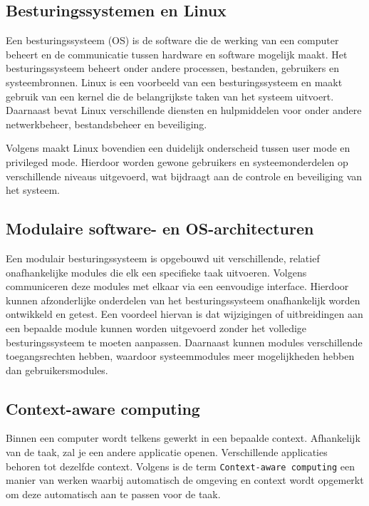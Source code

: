 \documentclass{hogent-article}
\begin{document}
\subsection{Besturingssystemen en Linux}
\label{ssec:besturingssytemen}

Een besturingssysteem (OS) is de software die de werking van een computer beheert en de communicatie tussen hardware en software mogelijk maakt. Het besturingssysteem beheert onder andere processen, bestanden, gebruikers en systeembronnen. Linux is een voorbeeld van een besturingssysteem en maakt gebruik van een kernel die de belangrijkste taken van het systeem uitvoert. Daarnaast bevat Linux verschillende diensten en hulpmiddelen voor onder andere netwerkbeheer, bestandsbeheer en beveiliging.

Volgens \textcite{Fox2021} maakt Linux bovendien een duidelijk onderscheid tussen user mode en privileged mode. Hierdoor worden gewone gebruikers en systeemonderdelen op verschillende niveaus uitgevoerd, wat bijdraagt aan de controle en beveiliging van het systeem.

\subsection{Modulaire software- en OS-architecturen}
\label{ssec:modulairesytemen}

Een modulair besturingssysteem is opgebouwd uit verschillende, relatief onafhankelijke modules die elk een specifieke taak uitvoeren. Volgens \textcite{Wichmann1969} communiceren deze modules met elkaar via een eenvoudige interface. Hierdoor kunnen afzonderlijke onderdelen van het besturingssysteem onafhankelijk worden ontwikkeld en getest. Een voordeel hiervan is dat wijzigingen of uitbreidingen aan een bepaalde module kunnen worden uitgevoerd zonder het volledige besturingssysteem te moeten aanpassen. Daarnaast kunnen modules verschillende toegangsrechten hebben, waardoor systeemmodules meer mogelijkheden hebben dan gebruikersmodules.

\subsection{Context-aware computing}
\label{ssec:contextawarecomputing}

Binnen een computer wordt telkens gewerkt in een bepaalde context. Afhankelijk van de taak, zal je een andere applicatie openen. Verschillende applicaties behoren tot dezelfde context. Volgens \textcite{Sezer2018} is de term \texttt{Context-aware computing} een manier van werken waarbij automatisch de omgeving en context wordt opgemerkt om deze automatisch aan te passen voor de taak. 
\end{document}
